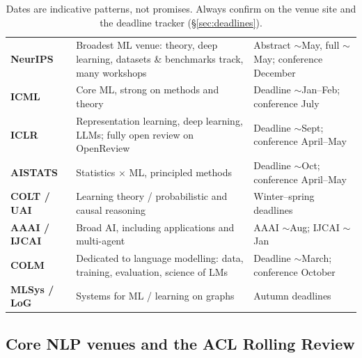 \documentclass[11pt,a4paper]{article}
\begin{document}
\begin{table}[h]
\centering
\small
\begin{tabularx}{\textwidth}{L{2.4cm} X L{3.5cm}}
\toprule
{} &  &  \\
\midrule
{}
\textbf{NeurIPS} & Broadest ML venue: theory, deep learning, datasets \&
benchmarks track, many workshops & Abstract $\sim$May, full $\sim$May;
conference December \\
\textbf{ICML} & Core ML, strong on methods and theory &
Deadline $\sim$Jan--Feb; conference July \\
\textbf{ICLR} & Representation learning, deep learning, LLMs; fully open
review on OpenReview & Deadline $\sim$Sept; conference April--May \\
\textbf{AISTATS} & Statistics $\times$ ML, principled methods &
Deadline $\sim$Oct; conference April--May \\
\textbf{COLT / UAI} & Learning theory / probabilistic and causal reasoning &
Winter--spring deadlines \\
\textbf{AAAI / IJCAI} & Broad AI, including applications and multi-agent &
AAAI $\sim$Aug; IJCAI $\sim$Jan \\
\textbf{COLM} & Dedicated to language modelling: data, training, evaluation,
science of LMs & Deadline $\sim$March; conference October \\
\textbf{MLSys / LoG} & Systems for ML / learning on graphs &
Autumn deadlines \\
\bottomrule
\end{tabularx}
\caption*{\small\color{mutegray} Dates are indicative patterns, not promises.
Always confirm on the venue site and the deadline tracker (\S\ref{sec:deadlines}).}
\end{table}

\subsection{Core NLP venues and the ACL Rolling Review}
\end{document}

